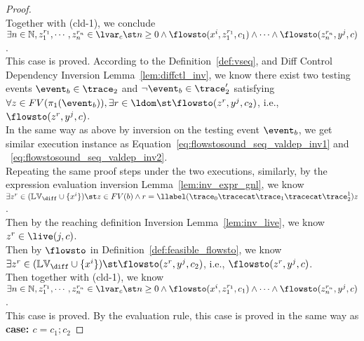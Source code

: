 \begin{proof}
\\
Together with (cld-1), we conclude 
\\
$\exists n \in \mathbb{N}, z_1^{r_1}, \cdots, z_n^{r_n} \in \lvar_{{c}} \st n \geq 0 \land
\flowsto(x^i,  z_1^{r_1}, c_1) 
\land \cdots \land \flowsto(z_n^{r_n}, y^j, c)$.
\\
This case is proved.
According to the Definition~\ref{def:vseq},
and {Diff Control Dependency Inversion Lemma~\ref{lem:diffctl_inv}}, we know 
there exist two testing events $\event_b \in \trace_2$ and $\neg\event_b \in \trace_2'$ satisfying 
\\
$\forall z \in FV(\pi_1(\event_b)), \exists r \in \ldom \st \flowsto(z^r, y^j, c_2)$, 
i.e., $\flowsto(z^r, y^j, c)$.
\\
In the same way as above by inversion on the testing event $\event_b$, we get similar execution instance as 
Equation~\ref{eq:flowstosound_seq_valdep_inv1} and ~\ref{eq:flowstosound_seq_valdep_inv2}.
\\
Repeating the same proof steps under the two executions,
similarly, by the expression evaluation inversion Lemma~\ref{lem:inv_expr_gnl}, we know 
\\
$\exists z^r \in (\mathbb{LV}_{\diff} \cup \{x^i\} ) \st z \in FV(b) 
\land r = \llabel(\trace_0 \tracecat \trace_1 \tracecat \trace_2^1) z$.
\\
Then by the reaching definition Inversion Lemma~\ref{lem:inv_live}, we know $z^r \in \live(j, c)$.
\\
Then by $\flowsto$ in Definition~\ref{def:feasible_flowsto}, 
we know 
$ \exists z^r \in (\mathbb{LV}_{\diff} \cup \{x^i\} ) \st \flowsto(z^r, y^j, c_2)$, i.e., $\flowsto(z^r, y^j, c)$.
\\
Then together with (cld-1),
we know 
\\
$\exists n \in \mathbb{N}, z_1^{r_1}, \cdots, z_n^{r_n} \in \lvar_{{c}} \st n \geq 0 \land
\flowsto(x^i,  z_1^{r_1}, c_1) 
\land \cdots \land \flowsto(z_n^{r_n}, y^j, c)$.
\\
This case is proved.
  By the evaluation rule, this case is proved in the same way as \textbf{case: $c = c_1; c_2$}
\end{proof}

